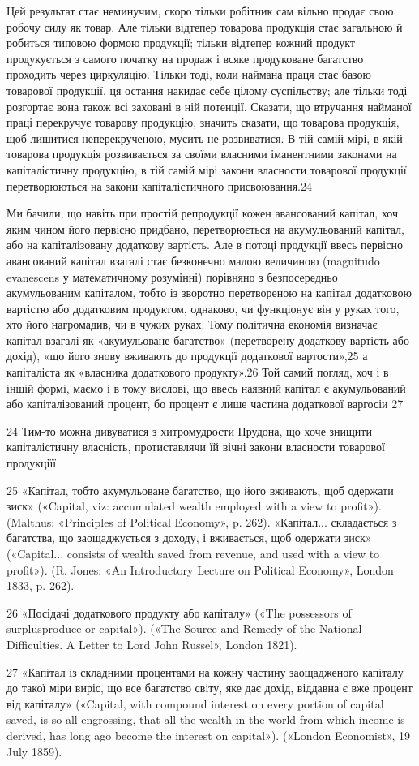 Цей результат стає неминучим, скоро тільки робітник сам
вільно продає свою робочу силу як товар. Але тільки відтепер товарова
продукція стає загальною й робиться типовою формою продукції;
тільки відтепер кожний продукт продукується з самого
початку на продаж і всяке продуковане багатство проходить через
циркуляцію. Тільки тоді, коли наймана праця стає базою товарової
продукції, ця остання накидає себе цілому суспільству;
але тільки тоді розгортає вона також всі заховані в ній потенції.
Сказати, що втручання найманої праці перекручує товарову
продукцію, значить сказати, що товарова продукція, щоб лишитися
неперекрученою, мусить не розвиватися. В тій самій мірі,
в якій товарова продукція розвивається за своїми власними
іманентними законами на капіталістичну продукцію, в тій самій
мірі закони власности товарової продукції перетворюються на
закони капіталістичного присвоювання.24

Ми бачили, що навіть при простій репродукції кожен авансований
капітал, хоч яким чином його первісно придбано, перетворюється
на акумульований капітал, або на капіталізовану
додаткову вартість. Але в потоці продукції ввесь первісно авансований
капітал взагалі стає безконечно малою величиною (magnitudo
evanescens у математичному розумінні) порівняно з безпосередньо
акумульованим капіталом, тобто із зворотно перетвореною
на капітал додатковою вартістю або додатковим продуктом,
однаково, чи функціонує він у руках того, хто його нагромадив,
чи в чужих руках. Тому політична економія визначає капітал
взагалі як «акумульоване багатство» (перетворену додаткову
вартість або дохід), «що його знову вживають до продукції додаткової
вартости»,25 а капіталіста як «власника додаткового
продукту».26 Той самий погляд, хоч і в іншій формі, маємо і
в тому вислові, що ввесь наявний капітал є акумульований або
капіталізований процент, бо процент є лише частина додаткової
варгосіи 27

24    Тим-то можна дивуватися з хитромудрости Прудона, що хоче знищити
капіталістичну власність, протиставлячи їй вічні закони власности
товарової продукціїї

25 «Капітал, тобто акумульоване багатство, що його вживають, щоб
одержати зиск» («Capital, viz: accumulated wealth employed with a
view to profit»). (Malthus: «Principles of Political Economy», p. 262).
«Капітал... складається з багатства, що заощаджується з доходу, і вживається,
щоб одержати зиск» («Capital... consists of wealth saved from
revenue, and used with a view to profit»). (R. Jones: «An Introductory
Lecture on Political Economy», London 1833, p. 262).

26 «Посідачі додаткового продукту або капіталу» («The possessors
of surplusproduce or capital»). («The Source and Remedy of the National
Difficulties. A Letter to Lord John Russel», London 1821).

27 «Капітал із складними процентами на кожну частину заощадженого
капіталу до такої міри виріс, що все багатство світу, яке дає дохід,
віддавна є вже процент від капіталу» («Capital, with compound interest
on every portion of capital saved, is so all engrossing, that all the wealth
in the world from which income is derived, has long ago become the
interest on capital»). («London Economist», 19 July 1859).
